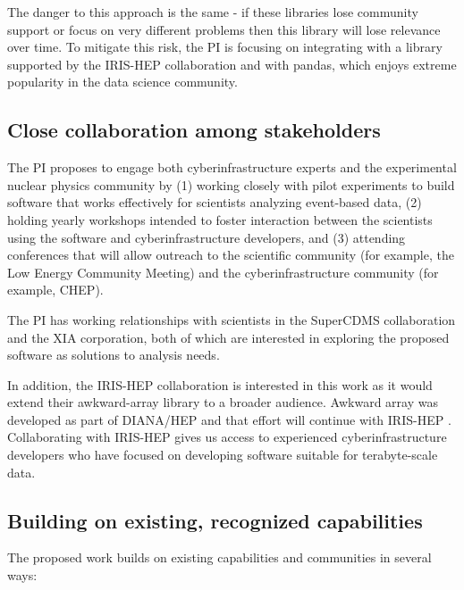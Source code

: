 The danger to this approach is the same - if these libraries lose community support or focus on very different problems then this library will lose relevance over time.  To mitigate this risk, the PI is focusing on integrating with a library supported by the IRIS-HEP collaboration and with pandas, which enjoys extreme popularity in the data science community.

\subsection{Close collaboration among stakeholders}

The PI proposes to engage both cyberinfrastructure experts and the experimental nuclear physics community by (1) working closely with pilot experiments to build software that works effectively for scientists analyzing event-based data, (2) holding yearly workshops intended to foster interaction between the scientists using the software and cyberinfrastructure developers, and (3) attending conferences that will allow outreach to the scientific community (for example, the Low Energy Community Meeting) and the cyberinfrastructure community (for example, CHEP).

The PI has working relationships with scientists in the SuperCDMS collaboration and the XIA corporation, both of which are interested in exploring the proposed software as solutions to analysis needs.

In addition, the IRIS-HEP collaboration is interested in this work as it would extend their awkward-array library to a broader audience.  Awkward array was developed as part of DIANA/HEP \cite{diana-hep} and that effort will continue with IRIS-HEP \cite{iris-hep}
.  Collaborating with IRIS-HEP gives us access to experienced cyberinfrastructure developers who have focused on developing software suitable for terabyte-scale data.


\subsection{Building on existing, recognized capabilities}

The proposed work builds on existing capabilities and communities in several ways:

